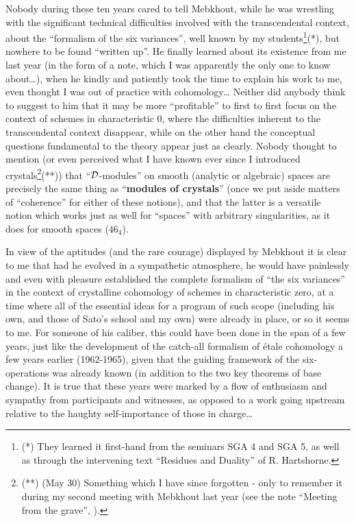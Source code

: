 Nobody during these ten years cared to tell Mebkhout, while
he was wrestling
with the significant technical difficulties involved with the transcendental context, 
about the ``formalism of the six variances'', well known by my students\footnote{(*) They
learned it first-hand from the seminars SGA 4 and SGA 5, as well as through the
intervening text ``Residues and Duality'' of R. Hartshorne.}(*), but nowhere to be
found ``written up''.
He finally learned about its existence from me last year 
(in the form of a note, which I was apparently the only one to know about\ldots),
when he kindly and patiently took the time to explain his work to me, even thought I was
out of practice with cohomology\ldots
Neither did anybody think to suggest to him that it may be more ``profitable'' to first
to first focus on the context of schemes in characteristic $0$, where the difficulties
inherent to the transcendental context disappear, while on the other hand the conceptual
questions fundamental to the theory appear just as clearly. 
Nobody thought to mention 
(or even perceived
what I have known ever since I introduced crystals\footnote{(**) (May 30) Something
which I have since forgotten - only to remember it during my second meeting with Mebkhout
last year (see the note ``Meeting from the grave'', ).}(**))
that ``$\mathcal{D}$-modules'' on smooth (analytic or algebraic) spaces are precisely the same
thing as ``\textbf{modules of crystals}'' (once we put aside matters of ``coherence'' for
either of these notions), and that the latter is a versatile notion which works just as
well for ``spaces'' with arbitrary singularities, as it does for smooth spaces ($46_4$).

In view of the aptitudes (and the rare courage) displayed by Mebkhout it is clear to me
that had he evolved in a sympathetic atmosphere, he would have painlessly and even 
with pleasure established the complete formalism of ``the six variances'' in the context
of crystalline cohomology of schemes in characteristic zero, at a time where all of the
essential ideas for a program of such scope
(including his own, and those of Sato's school and my own)
were already in place, or so it seems to me.
For someone of his caliber, this could have been done in the span of a few years, 
just like the development of the catch-all formalism 
of \'etale cohomology a few years
earlier (1962-1965), given that the guiding framework of the six-operations was already
known (in addition to the two key theorems of base change).
It is true that these years were marked by a flow of enthusiasm and sympathy 
from participants and witnesses, as opposed to a work going upstream relative to the
haughty self-importance of those in charge\ldots

